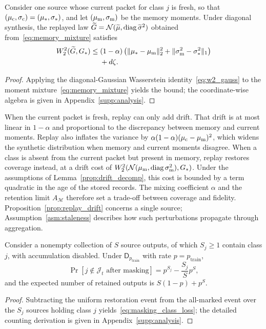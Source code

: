 \begin{prop}
\label{prop:replay_drift}
Consider one source whose current packet for class $j$ is fresh, so that $(\mu_{\mathrm c},\sigma_{\mathrm c})=(\mu_*,\sigma_*)$, and let $(\mu_{\mathrm m},\sigma_{\mathrm m})$ be the memory moments. Under diagonal synthesis, the replayed law $\widetilde G=\mathcal N(\widetilde{\mu},\operatorname{diag}\widetilde{\sigma}^2)$ obtained from~\eqref{eq:memory_mixture} satisfies
\begin{equation}
\begin{split}
 W_2^2(\widetilde G,G_*)
 \le{}&(1-\alpha)\left(\|\mu_*-\mu_{\mathrm m}\|_2^2
 +\|\sigma_{\mathrm m}^2-\sigma_*^2\|_1\right)\\
 &+d\zeta.
\end{split}
 \label{eq:replay_drift_bound}
\end{equation}
\end{prop}
\begin{proof}
Applying the diagonal-Gaussian Wasserstein identity~\eqref{eq:w2_gauss} to the moment mixture~\eqref{eq:memory_mixture} yields the bound; the coordinate-wise algebra is given in Appendix~\ref{supp:analysis}.
\end{proof}

When the current packet is fresh, replay can only add drift. That drift is at most linear in $1-\alpha$ and proportional to the discrepancy between memory and current moments. Replay also inflates the variance by $\alpha(1-\alpha)(\mu_{\mathrm c}-\mu_{\mathrm m})^2$, which widens the synthetic distribution when memory and current moments disagree. When a class is absent from the current packet but present in memory, replay restores coverage instead, at a drift cost of $W_2^2(\mathcal N(\mu_{\mathrm m},\operatorname{diag}\sigma_{\mathrm m}^2),G_*)$. Under the assumptions of Lemma~\ref{prop:drift_decomp}, this cost is bounded by a term quadratic in the age of the stored records. The mixing coefficient $\alpha$ and the retention limit $A_{\mathcal M}$ therefore set a trade-off between coverage and fidelity. Proposition~\ref{prop:replay_drift} concerns a single source; Assumption~\ref{asm:staleness} describes how such perturbations propagate through aggregation.

\begin{prop}
\label{prop:masking_coverage}
Consider a nonempty collection of $S$ source outputs, of which $S_j\ge1$ contain class $j$, with accumulation disabled. Under $\mathsf D_{p_{\mathrm{train}}}$ with rate $p=p_{\mathrm{train}}$,
\begin{equation}
 \Pr[j\notin\mathcal J_t\text{ after masking}]
 =p^{S_j}-\frac{S_j}{S}p^S,
 \label{eq:masking_class_loss}
\end{equation}
and the expected number of retained outputs is $S(1-p)+p^S$.
\end{prop}
\begin{proof}
Subtracting the uniform restoration event from the all-marked event over the $S_j$ sources holding class $j$ yields~\eqref{eq:masking_class_loss}; the detailed counting derivation is given in Appendix~\ref{supp:analysis}.
\end{proof}

